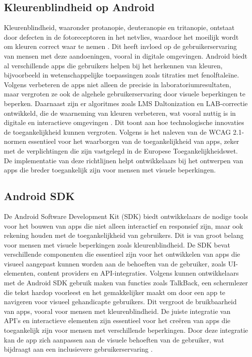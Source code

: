 \subsection{Kleurenblindheid op Android}
Kleurenblindheid, waaronder protanopie, deuteranopie en tritanopie, ontstaat door defecten in de 
fotoreceptoren in het netvlies, waardoor het moeilijk wordt om kleuren correct waar te nemen \autocite{Salih2020}. 
Dit heeft invloed op de gebruikerservaring van mensen met deze aandoeningen, vooral in digitale omgevingen. 
Android biedt al verschillende apps die gebruikers helpen bij het herkennen van kleuren, bijvoorbeeld 
in wetenschappelijke toepassingen zoals titraties met fenolftaleïne. Volgens \textcite{Bandyopadhyay2017} verbeteren 
de apps niet alleen de precisie in laboratoriumresultaten, maar vergroten ze ook de algehele gebruikerservaring 
door visuele beperkingen te beperken. Daarnaast zijn er algoritmes zoals LMS Daltonization en LAB-correctie 
ontwikkeld, die de waarneming van kleuren verbeteren, wat vooral nuttig is in digitale en interactieve 
omgevingen \autocite{Baswaraju2020}. Dit toont aan hoe technologische innovaties de toegankelijkheid kunnen vergroten. 
Volgens \textcite{Crawford2024} is het naleven van de WCAG 2.1-normen essentieel voor het waarborgen van de 
toegankelijkheid van apps, zeker met de verplichtingen die zijn vastgelegd in de Europese Toegankelijkheidswet.
De implementatie van deze richtlijnen helpt ontwikkelaars bij het ontwerpen van apps die breder toegankelijk
zijn voor mensen met visuele beperkingen.
\subsection{Android SDK}
De Android Software Development Kit (SDK) biedt ontwikkelaars de nodige tools voor het bouwen 
van apps die niet alleen interactief en responsief zijn, maar ook rekening houden met 
de toegankelijkheid van gebruikers. Dit is van groot belang voor mensen met visuele beperkingen 
zoals kleurenblindheid. De SDK bevat verschillende componenten die essentieel zijn voor het 
ontwikkelen van apps die visueel aangepast kunnen worden aan de behoeften van de gebruiker, 
zoals UI-elementen, content providers en API-integraties. Volgens \textcite{Geeks2024} kunnen ontwikkelaars 
met de Android SDK gebruik maken van functies zoals TalkBack, een schermlezer die tekst hardop 
voorleest en het gemakkelijker maakt om door een app te navigeren voor visueel gehandicapte gebruikers. 
Dit vergroot de bruikbaarheid van apps, vooral voor mensen met kleurenblindheid. De juiste integratie 
van API's en interactieve elementen zijn essentieel voor het creëren van apps die toegankelijk zijn 
voor mensen met verschillende beperkingen. Door deze integratie kan de app zich aanpassen aan de 
visuele behoeften van de gebruiker, wat bijdraagt aan een inclusievere gebruikerservaring \autocite{Lee2011}.
